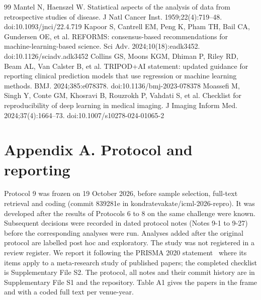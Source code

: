 \documentclass[11pt]{article}
\begin{document}
\begin{thebibliography}{99}
 Mantel N, Haenszel W. Statistical aspects of the analysis of data from retrospective studies of disease. J Natl Cancer Inst. 1959;22(4):719–48. doi:10.1093/jnci/22.4.719
 Kapoor S, Cantrell EM, Peng K, Pham TH, Bail CA, Gundersen OE, et al. REFORMS: consensus-based recommendations for machine-learning-based science. Sci Adv. 2024;10(18):eadk3452. doi:10.1126/sciadv.adk3452
 Collins GS, Moons KGM, Dhiman P, Riley RD, Beam AL, Van Calster B, et al. TRIPOD+AI statement: updated guidance for reporting clinical prediction models that use regression or machine learning methods. BMJ. 2024;385:e078378. doi:10.1136/bmj-2023-078378
 Moassefi M, Singh Y, Conte GM, Khosravi B, Rouzrokh P, Vahdati S, et al. Checklist for reproducibility of deep learning in medical imaging. J Imaging Inform Med. 2024;37(4):1664–73. doi:10.1007/s10278-024-01065-2
\end{thebibliography}
\section*{Appendix A. Protocol and reporting}
Protocol 9 was frozen on 19 October 2026, before sample selection, full-text retrieval and coding (commit 839281e in kondratevakate/icml-2026-repro). It was developed after the results of Protocols 6 to 8 on the same challenge were known. Subsequent decisions were recorded in dated protocol notes (Notes 9-1 to 9-27) before the corresponding analyses were run. Analyses added after the original protocol are labelled post hoc and exploratory. The study was not registered in a review register. We report it following the PRISMA 2020 statement~\cite{r10} where its items apply to a meta-research study of published papers; the completed checklist is Supplementary File S2. The protocol, all notes and their commit history are in Supplementary File S1 and the repository. Table A1 gives the papers in the frame and with a coded full text per venue-year.
\end{document}
